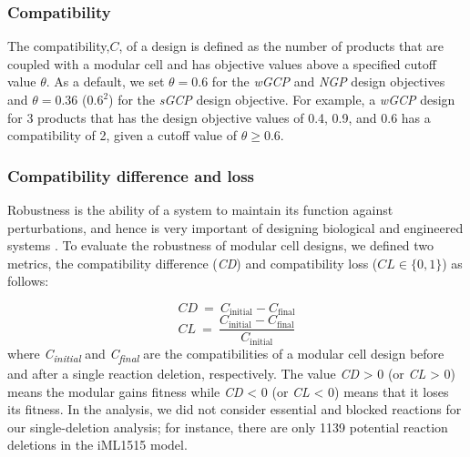 \subsubsection{Compatibility}
The compatibility,$C$, %
of a design is defined as the number of
products that are coupled with a modular cell and has objective values
above a specified cutoff value $\theta$. As a default, we set
$\theta=0.6$ for the \emph{wGCP} and \emph{NGP} design objectives and
$\theta=0.36$ ($0.6^2$) for the \emph{sGCP}
design objective. For example, a \emph{wGCP} design for 3 products that
has the design objective values of 0.4, 0.9, and 0.6 has a compatibility
of 2, given a cutoff value of $\theta \ge 0.6$.

\subsubsection{Compatibility difference and loss} Robustness is the
ability of a system to maintain its function against perturbations, and
hence is very important of designing biological and engineered systems
\citep{kitano2004}. To evaluate the robustness of modular cell
designs, we defined two metrics, the compatibility difference
(\emph{CD}) and compatibility loss ($CL \in \{0,1\}$) as follows:

\begin{equation}
CD\  = \ C_{\text{initial}} - C_{\text{final}}
\end{equation}
\begin{equation}
CL\  = \ \frac{C_{\text{initial}} - C_{\text{final}}}{C_{\text{initial}}}
\end{equation}
\noindent where \emph{C\textsubscript{initial}} and \emph{C\textsubscript{final}} are the compatibilities of a modular cell design before and after a single reaction deletion, respectively.
The value \emph{CD} \textgreater{} 0 (or \emph{CL} \textgreater{} 0) means the modular gains fitness while \emph{CD} \textless{} 0 (or \emph{CL} \textless{} 0) means that it loses its fitness.
In the analysis, we did not consider essential and blocked reactions for our single-deletion analysis; for instance, there are only 1139 potential reaction deletions in the iML1515 model.

